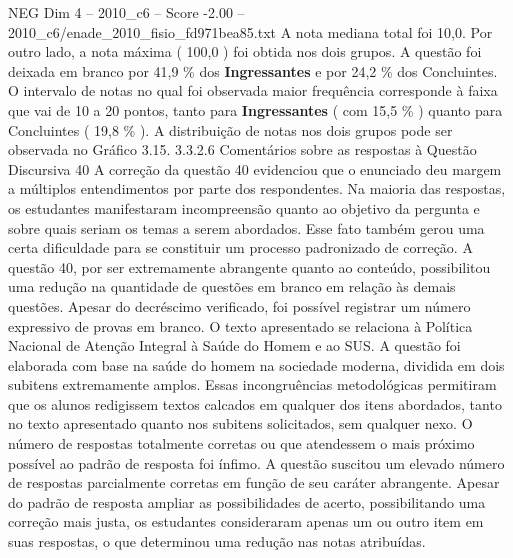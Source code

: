 \begin{textsample}{NEG Dim 4 – 2010\_c6 – Score -2.00 – 2010\_c6/enade\_2010\_fisio\_fd971bea85.txt}
A nota mediana total foi 10,0.
Por outro lado, a nota máxima ( 100,0 ) foi obtida nos dois grupos.
A questão foi deixada em branco por 41,9 \% dos \textbf{Ingressantes} e por 24,2 \% dos Concluintes.
O intervalo de notas no qual foi observada maior frequência corresponde à faixa que vai de 10 a 20 pontos, tanto para \textbf{Ingressantes} ( com 15,5 \% ) quanto para Concluintes ( 19,8 \% ).
A distribuição de notas nos dois grupos pode ser observada no Gráfico 3.15. 3.3.2.6 Comentários sobre as respostas à Questão Discursiva 40 A correção da questão 40 evidenciou que o enunciado deu margem a múltiplos entendimentos por parte dos respondentes.
Na maioria das respostas, os estudantes manifestaram incompreensão quanto ao objetivo da pergunta e sobre quais seriam os temas a serem abordados.
Esse fato também gerou uma certa dificuldade para se constituir um processo padronizado de correção.
A questão 40, por ser extremamente abrangente quanto ao conteúdo, possibilitou uma redução na quantidade de questões em branco em relação às demais questões.
Apesar do decréscimo verificado, foi possível registrar um número expressivo de provas em branco.
O texto apresentado se relaciona à Política Nacional de Atenção Integral à Saúde do Homem e ao SUS.
A questão foi elaborada com base na saúde do homem na sociedade moderna, dividida em dois subitens extremamente amplos.
Essas incongruências metodológicas permitiram que os alunos redigissem textos calcados em qualquer dos itens abordados, tanto no texto apresentado quanto nos subitens solicitados, sem qualquer nexo.
O número de respostas totalmente corretas ou que atendessem o mais próximo possível ao padrão de resposta foi ínfimo.
A questão suscitou um elevado número de respostas parcialmente corretas em função de seu caráter abrangente.
Apesar do padrão de resposta ampliar as possibilidades de acerto, possibilitando uma correção mais justa, os estudantes consideraram apenas um ou outro item em suas respostas, o que determinou uma redução nas notas atribuídas.

\end{textsample}
